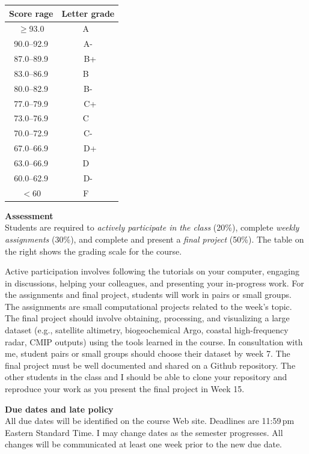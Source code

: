 \documentclass[11pt]{article}
\begin{document}
\begin{table}
\centering
	\begin{tabular}{|c|c|}
		\hline
		\rowcolor{Gray}
		Score rage & Letter grade \\
		\hline
		$\ge$93.0&  A~  \\		
		\rowcolor{Gray2}
		90.0--92.9 &  A-  \\		
		87.0--89.9 &  ~B\tiny{+}  \\		
		\rowcolor{Gray2}
		83.0--86.9 &  B~  \\		
		80.0--82.9&  B-  \\		
		\rowcolor{Gray2}
		77.0--79.9&  ~C\tiny{+} \\
		73.0--76.9& C~ \\		
		\rowcolor{Gray2}
		70.0--72.9& C-\\		
		67.0--66.9&  ~D\tiny{+} \\
		\rowcolor{Gray2}
		63.0--66.9& D~\\
		60.0--62.9& D-\\
		\rowcolor{Gray2}
		$<$60& F~\\
		\hline
	\end{tabular}
\end{table}

\textbf{Assessment}\\
Students are required to \textit{actively participate in the class} (20\%), complete \textit{weekly assignments} (30\%), and complete and present a \textit{final project} (50\%). The table on the right shows the grading scale for the course. 

 Active participation involves following the tutorials on your computer,
 engaging in discussions, helping your colleagues, and presenting your
 in-progress work. For the assignments and final project, students will work in
 pairs or small groups.  The assignments are small computational projects
 related to the week's topic. The final project should involve obtaining,
 processing, and visualizing a large dataset (e.g., satellite altimetry,
 biogeochemical Argo, coastal high-frequency radar, CMIP outputs) using the
 tools learned in the course. In consultation with me, student pairs or small
 groups should choose their dataset by week 7. The final project must be well
 documented and shared on a Github repository. The other students in the class
 and I should be able to clone your repository and reproduce your work as you
 present the final project in Week 15.

\textbf{Due dates and late policy}\\
All due dates will be identified on the course Web site. Deadlines are 11:59\,pm Eastern Standard Time. I may change dates as the semester progresses.  All changes will be communicated at least one week prior to the new due date. 
\end{document}
